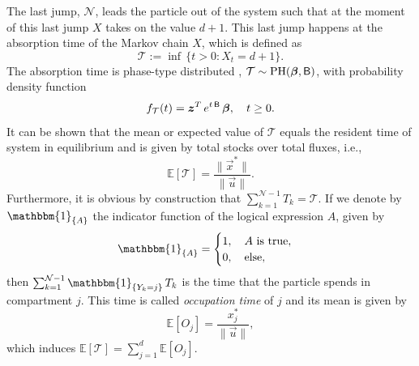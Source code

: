 \documentclass[smallextended]{svjour3}
\makeatletter
\renewcommand*{\eqref}[1]{%
  \hyperref[{#1}]{\textup{\tagform@{\ref*{#1}}}}%
}
\newcommand{\E}{\mathbb{E}}
\newcommand{\TT}{\mathcal{T}}
\newcommand{\PH}{\operatorname{PH}}
\newcommand{\vnorms}[1]{\|#1\|}
\newcommand{\pdf}{probability density function}
\makeatother
\begin{document}
The last jump, $\mathcal{N}$, leads the particle out of the system such that at the moment of this last jump $X$ takes on the value $d+1$.
This last jump happens at the absorption time of the Markov chain $X$, which is defined as
\begin{equation*}
   \TT := \inf\,\{t>0: X_t=d+1\}.
\end{equation*}
The absorption time is phase-type distributed \citep{Neuts1981}, $\TT\sim\PH(\vec{\beta},\tens{B})$, with \pdf
\begin{equation*}
  f_{\TT}(t) = \vec{z}^T\,e^{t\,\tens{B}}\,\vec{\beta},\quad t\geq0.
\end{equation*}
It can be shown \citep[Section 3.2]{Metzler2018MGS} that the mean or expected value of $\TT$ equals the resident time \citep{Sierra2016GlobChangBiol} of system \eqref{eqn:lin_CS_sys} in equilibrium and is given by total stocks over total fluxes, i.e., 
\begin{equation*}
  \E\left[\TT\right] = \frac{\vnorms{\vec{x}^\ast}}{\vnorms{\vec{u}}}.
\end{equation*}
Furthermore, it is obvious by construction that $\sum_{k=1}^{\mathcal{N}-1} T_k = \TT$.
If we denote by $\mathbbm{1}_{\{A\}}$ the indicator function of the logical expression $A$, given by
\begin{equation*}
  \mathbbm{1}_{\{A\}} =
  \begin{cases}
    1, \quad A\text{ is true},\\
    0, \quad\text{else},
  \end{cases}
\end{equation*}
then $\sum_{k=1}^{\mathcal{N}-1} \mathbbm{1}_{\{Y_k=j\}}\,T_k$ is the time that the particle spends in compartment $j$.
This time is called \emph{occupation time} of $j$ and its mean is given by \citep[Section 3.3]{Metzler2018MGS}
\begin{equation}
  \label{eqn:occupation_time}
  \E\left[O_j\right] = \frac{x^\ast_j}{\vnorms{\vec{u}}},
\end{equation}
which induces $\E\left[\TT\right] = \sum_{j=1}^d \E\left[O_j\right]$.
\end{document}
